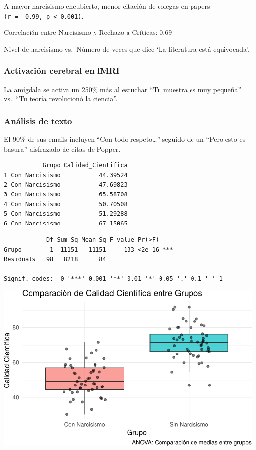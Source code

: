 \documentclass[
]{article}
\begin{document}
A mayor narcisismo encubierto, menor citación de colegas en papers
\texttt{(r\ =\ -0.99,\ p\ \textless{}\ 0.001)}.

Correlación entre Narcisismo y Rechazo a Críticas: 0.69

Nivel de narcisismo vs.~Número de veces que dice `La literatura está
equivocada'.

\subsubsection{Activación cerebral en
fMRI}\label{activaciuxf3n-cerebral-en-fmri}

La amígdala se activa un 250\% más al escuchar ``Tu muestra es muy
pequeña'' vs.~``Tu teoría revolucionó la ciencia''.

\subsubsection{Análisis de texto}\label{anuxe1lisis-de-texto}

El 90\% de sus emails incluyen ``Con todo respeto\ldots{}'' seguido de
un ``Pero esto es basura'' disfrazado de citas de Popper.

\begin{verbatim}
           Grupo Calidad_Cientifica
1 Con Narcisismo           44.39524
2 Con Narcisismo           47.69823
3 Con Narcisismo           65.58708
4 Con Narcisismo           50.70508
5 Con Narcisismo           51.29288
6 Con Narcisismo           67.15065
\end{verbatim}

\begin{verbatim}
            Df Sum Sq Mean Sq F value Pr(>F)    
Grupo        1  11151   11151     133 <2e-16 ***
Residuals   98   8218      84                   
---
Signif. codes:  0 '***' 0.001 '**' 0.01 '*' 0.05 '.' 0.1 ' ' 1
\end{verbatim}

\includegraphics{template_files/figure-pdf/unnamed-chunk-4-1.pdf}
\end{document}
